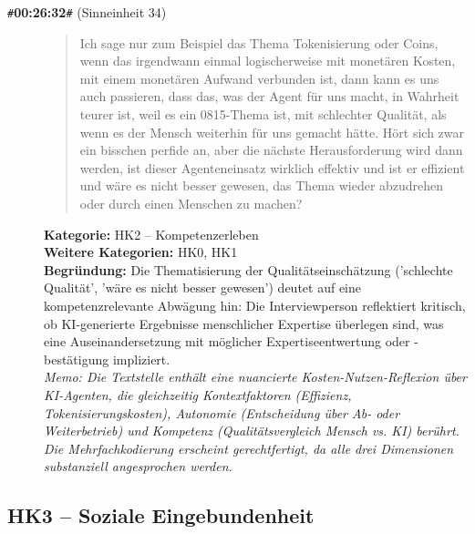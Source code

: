 \begin{description}
  \item[\texttt{\#}\textbf{00:26:32}\texttt{\#} (Sinneinheit 34)]
  \begin{quote}
  Ich sage nur zum Beispiel das Thema Tokenisierung oder Coins, wenn das irgendwann einmal logischerweise mit monetären Kosten, mit einem monetären Aufwand verbunden ist, dann kann es uns auch passieren, dass das, was der Agent für uns macht, in Wahrheit teurer ist, weil es ein 0815-Thema ist, mit schlechter Qualität, als wenn es der Mensch weiterhin für uns gemacht hätte. Hört sich zwar ein bisschen perfide an, aber die nächste Herausforderung wird dann werden, ist dieser Agenteneinsatz wirklich effektiv und ist er effizient und wäre es nicht besser gewesen, das Thema wieder abzudrehen oder durch einen Menschen zu machen?
  \end{quote}
  \textbf{Kategorie:} HK2 -- Kompetenzerleben\\
  \textbf{Weitere Kategorien:} HK0, HK1\\
  \textbf{Begr\"undung:} Die Thematisierung der Qualitätseinschätzung ('schlechte Qualität', 'wäre es nicht besser gewesen') deutet auf eine kompetenzrelevante Abwägung hin: Die Interviewperson reflektiert kritisch, ob KI-generierte Ergebnisse menschlicher Expertise überlegen sind, was eine Auseinandersetzung mit möglicher Expertiseentwertung oder -bestätigung impliziert.
  \\\textit{Memo: Die Textstelle enthält eine nuancierte Kosten-Nutzen-Reflexion über KI-Agenten, die gleichzeitig Kontextfaktoren (Effizienz, Tokenisierungskosten), Autonomie (Entscheidung über Ab- oder Weiterbetrieb) und Kompetenz (Qualitätsvergleich Mensch vs. KI) berührt. Die Mehrfachkodierung erscheint gerechtfertigt, da alle drei Dimensionen substanziell angesprochen werden.}
\end{description}
\medskip

\subsection*{HK3 -- Soziale Eingebundenheit}

